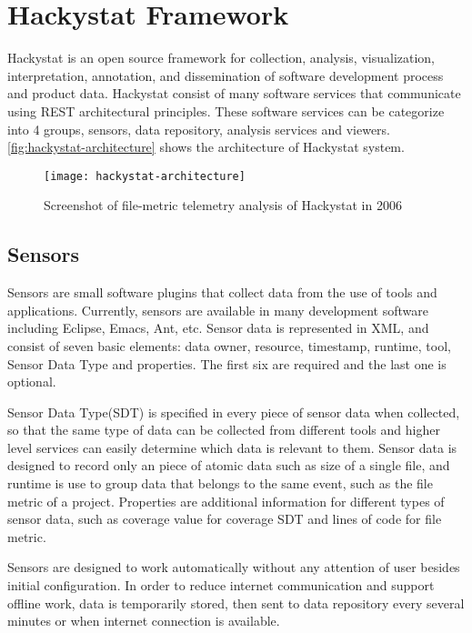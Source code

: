 \section{Hackystat Framework}
Hackystat is an open source framework for collection, analysis, visualization, interpretation, annotation, and dissemination of software development process and product data. Hackystat consist of many software services that communicate using REST architectural principles\cite{wiki:restful}. These software services can be categorize into 4 groups, sensors, data repository, analysis services and viewers. \autoref{fig:hackystat-architecture} shows the architecture of Hackystat system. 

\begin{figure}[htbp]
   \centering
   \texttt{[image: hackystat-architecture]} 
   \caption{Screenshot of file-metric telemetry analysis of Hackystat in 2006}
   \label{fig:hackystat-architecture}
\end{figure}

\subsection{Sensors}
Sensors are small software plugins that collect data from the use of tools and applications. Currently, sensors are available in many development software including Eclipse, Emacs, Ant, etc. Sensor data is represented in XML, and consist of seven basic elements: data owner, resource, timestamp, runtime, tool, Sensor Data Type and properties. The first six are required and the last one is optional. 

Sensor Data Type(SDT) is specified in every piece of sensor data when collected, so that the same type of data can be collected from different tools and higher level services can easily determine which data is relevant to them. Sensor data is designed to record only an piece of atomic data such as size of a single file, and runtime is use to group data that belongs to the same event, such as the file metric of a project. Properties are additional information for different types of sensor data, such as coverage value for coverage SDT and lines of code for file metric. 

Sensors are designed to work automatically without any attention of user besides initial configuration. In order to reduce internet communication and support offline work, data is temporarily stored, then sent to data repository every several minutes or when internet connection is available.

